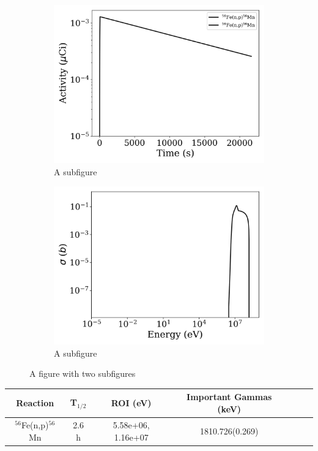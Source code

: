 \begin{figure}[h]
\centering
\begin{subfigure}{.5\textwidth}
  \centering
     \includegraphics[width=.8\textwidth]{plot/Fe-56(n,p)Mn-56_library1} 

  \caption{A subfigure}
  \label{fig:sub1}
\end{subfigure}%
\begin{subfigure}{.5\textwidth}
  \centering
     \includegraphics[width=.8\textwidth]{plot/Fe-56(n,p)Mn-56} 

  \caption{A subfigure}
  \label{fig:sub2}
\end{subfigure}
\caption{A figure with two subfigures}
\label{fig:test}
\end{figure}

\begin{table}[h]
\centering
\begin{tabular}{ |c|c|c|c|c|c|c| }
 \hline
 Reaction & T$_{1/2}$ & ROI (eV) & Important Gammas (keV) \\
 \hline 
 $^{56}$Fe(n,p)$^{56}$Mn &  2.6 h & 5.58e+06, 1.16e+07 & 1810.726(0.269) \\ 
\hline
\end{tabular}
\end{table}
